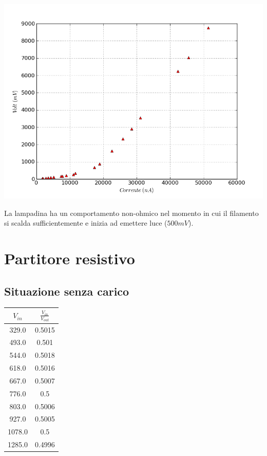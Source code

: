\includegraphics[scale=0.75]{grafici/C1/lampa.png}

La lampadina ha un comportamento non-ohmico nel momento in cui il filamento si scalda sufficientemente e inizia ad emettere luce ($500mV$).


\section{Partitore resistivo}

\subsection{Situazione senza carico}
\begin{center}
\begin{tabular}{*{2}{c}}
$V_{in}$ & $\frac{V_{in}}{V_{out}}$\\
\midrule
329.0 & 0.5015 \\
493.0 & 0.501 \\
544.0 & 0.5018 \\
618.0 & 0.5016 \\
667.0 & 0.5007 \\
776.0 & 0.5 \\
803.0 & 0.5006 \\
927.0 & 0.5005 \\
1078.0 & 0.5 \\
1285.0 & 0.4996 \\
\end{tabular}

\end{center}

